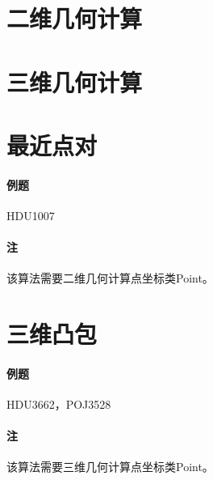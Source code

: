 \section{二维几何计算}


\section{三维几何计算}


\section{最近点对}

\paragraph{例题} HDU1007

\paragraph{注} 该算法需要二维几何计算点坐标类Point。



\section{三维凸包}

\paragraph{例题} HDU3662，POJ3528

\paragraph{注} 该算法需要三维几何计算点坐标类Point。


